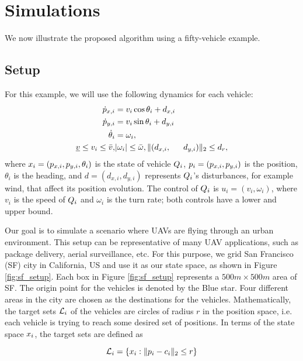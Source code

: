 \section{Simulations \label{sec:simulations}}
We now illustrate the proposed algorithm using a fifty-vehicle example. 

\subsection{Setup \label{sec:simSetup}}
For this example, we will use the following dynamics for each vehicle:
\begin{equation}
\label{eq:dyn_i}
\begin{aligned}
\dot{\pos}_{x,i} &= v_i \cos \theta_i + d_{x,i} \\
\dot{\pos}_{y,i} &= v_i \sin \theta_i + d_{y,i}\\
\dot{\theta}_i &= \omega_i, \\
\underline{v} \le v_i \le \bar{v}, & |\omega_i| \le \bar{\omega}, \|(d_{x,i}, & d_{y,i}) \|_2 \le d_{r},
\end{aligned}
\end{equation}
\noindent where $x_i = (p_{x,i}, p_{y,i}, \theta_i)$ is the state of vehicle $Q_i$, $p_i = (p_{x,i}, p_{y,i})$ is the position, $\theta_i$ is the heading, and $d = (d_{x,i}, d_{y,i})$ represents $Q_i$'s disturbances, for example wind, that affect its position evolution. The control of $Q_i$ is $u_i = (v_i, \omega_i)$, where $v_i$ is the speed of $Q_i$ and $\omega_i$ is the turn rate; both controls have a lower and upper bound. 

Our goal is to simulate a scenario where UAVs are flying through an urban environment. This setup can be representative of many UAV applications, such as package delivery, aerial surveillance, etc. For this purpose, we grid San Francisco (SF) city in California, US and use it as our state space, as shown in Figure \ref{fig:sf_setup}. Each box in Figure \ref{fig:sf_setup} represents a $500m \times 500m$ area of SF. The origin point for the vehicles is denoted by the Blue star. Four different areas in the city are chosen as the destinations for the vehicles. Mathematically, the target sets $\mathcal{L}_i$ of the vehicles are circles of radius $r$ in the position space, i.e. each vehicle is trying to reach some desired set of positions. In terms of the state space $x_i$, the target sets are defined as

\begin{equation}
\label{eq:target_sim}
\targetset_i = \{\state_i: \|\pos_i - c_i\|_2 \le r\}
\end{equation}

